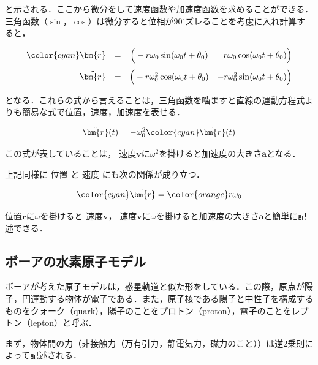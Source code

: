 \documentclass[a4paper,11pt]{ltjsarticle}
\begin{document}
と示される．ここから微分をして速度函数や加速度函数を求めることができる．
三角函数（$\sin$，$\cos$）は微分すると位相が$90^\circ$ズレることを考慮に入れ計算すると，

\begin{equation}
  \begin{array}{rccr}
    {\color{cyan} \dot{\bm{r}}} &=& \Big(-r\omega_0 \sin(\omega_0 t + \theta_0) & r\omega_0 \cos(\omega_0 t + \theta_0)\Big) \\[10pt]
    \ddot{\bm{r}} &=& \Big(-r\omega^2_0 \cos(\omega_0 t + \theta_0) & -r\omega^2_0 \sin(\omega_0 t + \theta_0)\Big)
  \end{array}
\end{equation}

となる．これらの式から言えることは，三角函数を噛ますと直線の運動方程式よりも簡易な式で位置，速度，加速度を表せる．

\begin{equation}
  \ddot{\bm{r}}(t) = -\omega^2_0 {\color{cyan}\dot{\bm{r}}(t)}
\end{equation}

この式が表していることは，{\color{cyan} 速度$\bm{v}$}に$\omega^2$を掛けると加速度の大きさ$\bm{a}$となる．

上記同様に{\color{orange} 位置 }と{\color{cyan} 速度 }にも次の関係が成り立つ．

\begin{equation}
  {\color{cyan} \dot{\bm{r}}} = {\color{orange}r}\omega_0
\end{equation}

{\color{orange} 位置$\bm{r}$}に$\omega$を掛けると{\color{cyan} 速度$\bm{v}$}，{\color{cyan} 速度$\bm{v}$}に$\omega$を掛けると加速度の大きさ$\bm{a}$と簡単に記述できる．

\clearpage

\subsection{ボーアの水素原子モデル}

ボーアが考えた原子モデルは，惑星軌道と似た形をしている．この際，原点が陽子，円運動する物体が電子である．また，原子核である陽子と中性子を構成するものをクォーク（quark），陽子のことをプロトン（proton），電子のことをレプトン（lepton）と呼ぶ．

まず，物体間の力（非接触力（万有引力，静電気力，磁力のこと））は逆2乗則によって記述される．
\end{document}
